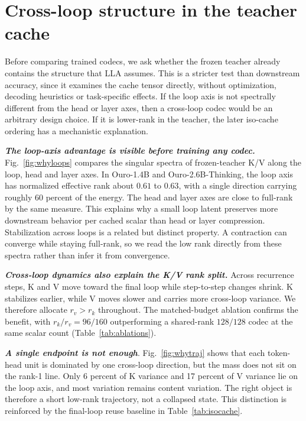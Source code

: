 \documentclass[10pt]{article}
\newcommand{\lla}{LLA}
\begin{document}
\section{Cross-loop structure in the teacher cache}
\FigureLoopRank
\label{sec:structure}
Before comparing trained codecs, we ask whether the frozen teacher already contains the structure that \lla{} assumes. This is a stricter test than downstream accuracy, since it examines the cache tensor directly, without optimization, decoding heuristics or task-specific effects. If the loop axis is not spectrally different from the head or layer axes, then a cross-loop codec would be an arbitrary design choice. If it is lower-rank in the teacher, the later iso-cache ordering has a mechanistic explanation.

\textbf{\textit{The loop-axis advantage is visible before training any codec.}} Fig.~\ref{fig:whyloops} compares the singular spectra of frozen-teacher K/V along the loop, head and layer axes. In Ouro-1.4B and Ouro-2.6B-Thinking, the loop axis has normalized effective rank about $0.61$ to $0.63$, with a single direction carrying roughly 60 percent of the energy. The head and layer axes are close to full-rank by the same measure. This explains why a small loop latent preserves more downstream behavior per cached scalar than head or layer compression. Stabilization across loops is a related but distinct property. A contraction can converge while staying full-rank, so we read the low rank directly from these spectra rather than infer it from convergence.

\textbf{\textit{Cross-loop dynamics also explain the K/V rank split.}} Across recurrence steps, K and V move toward the final loop while step-to-step changes shrink. K stabilizes earlier, while V moves slower and carries more cross-loop variance. We therefore allocate $r_v>r_k$ throughout. The matched-budget ablation confirms the benefit, with $r_k/r_v=96/160$ outperforming a shared-rank $128/128$ codec at the same scalar count (Table~\ref{tab:ablations}).


\textbf{\textit{A single endpoint is not enough}}. Fig.~\ref{fig:whytraj} shows that each token-head unit is dominated by one cross-loop direction, but the mass does not sit on the rank-1 line. Only 6 percent of K variance and 17 percent of V variance lie on the loop axis, and most variation remains content variation. The right object is therefore a short low-rank trajectory, not a collapsed state. This distinction is reinforced by the final-loop reuse baseline in Table~\ref{tab:isocache}.
\FigureTrajectory
\end{document}
